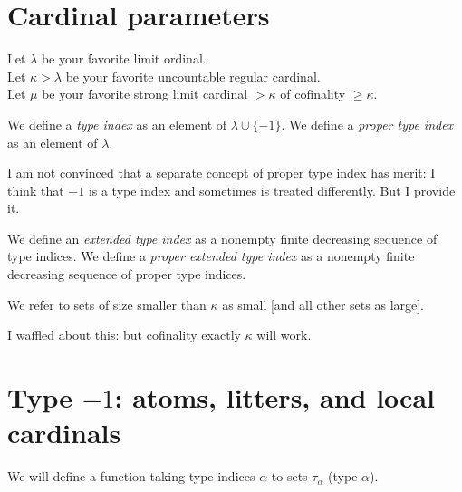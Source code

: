\section{Cardinal parameters}

\begin{definition}
\label {def:params}
\leanok
{}
Let $\lambda$ be your favorite limit ordinal. \\
Let $\kappa>\lambda$ be your favorite uncountable regular cardinal. \\
Let $\mu$ be your favorite strong limit cardinal $>\kappa$ of cofinality $\geq \kappa$.
\end{definition}

\begin{definition}
\label {def:type-index}
\leanok
{}
We define a {\em type index} as an element of $\lambda \cup \{-1\}$.
We define a {\em proper type index} as an element of $\lambda$.
\end{definition}

I am not convinced that a separate concept of proper type index has merit:  I think that $-1$ is a type index and sometimes is treated differently.  But I provide it.

\begin{definition}
\label {def:extended-type-index}
\leanok
{}
We define an {\em extended type index} as a nonempty finite decreasing sequence of type indices.
We define a {\em proper extended type index} as a nonempty finite decreasing sequence of proper type indices.
\end{definition}

\begin{definition}
\label {def:small}
\leanok
{}
We refer to sets of size smaller than $\kappa$ as small [and all other sets as large].
\end{definition}

I waffled about this:  but cofinality exactly $\kappa$ will work.

\section{Type $-1$: atoms, litters, and local cardinals}

We will define a function taking type indices $\alpha$ to sets $\tau_\alpha$ (type $\alpha$).

